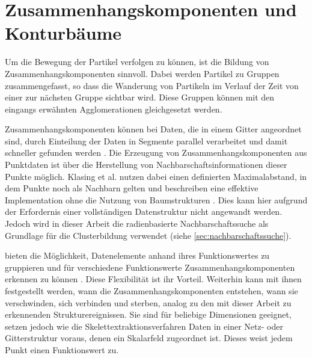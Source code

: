 

\section{Zusammenhangskomponenten und Konturbäume}\label{sec:related:connectedContour}

Um die Bewegung der Partikel verfolgen zu können, ist die Bildung von Zusammenhangskomponenten sinnvoll. Dabei werden Partikel zu Gruppen zusammengefasst, so dass die Wanderung von Partikeln im Verlauf der Zeit von einer zur nächsten Gruppe sichtbar wird. Diese Gruppen können mit den eingangs erwähnten Agglomerationen gleichgesetzt werden.

Zusammenhangskomponenten können bei Daten, die in einem Gitter angeordnet sind, durch Einteilung der Daten in Segmente parallel verarbeitet und damit schneller gefunden werden \cite{trevor2013efficient}. Die Erzeugung von Zusammenhangskomponenten aus Punktdaten ist über die Herstellung von Nachbarschaftsinformationen dieser Punkte möglich. Klasing et al. nutzen dabei einen definierten Maximalabstand, in dem Punkte noch als Nachbarn gelten und beschreiben eine effektive Implementation ohne die Nutzung von Baumstrukturen \cite{klasing2008efficientSegmentationOf3DLaserData}. Dies kann hier aufgrund der Erfordernis einer vollständigen Datenstruktur nicht angewandt werden. Jedoch wird in dieser Arbeit die radienbasierte Nachbarschaftssuche als Grundlage für die Clusterbildung verwendet (siehe \autoref{sec:nachbarschaftssuche}).

 bieten die Möglichkeit, Datenelemente anhand ihres Funktionswertes zu gruppieren und für verschiedene Funktionswerte Zusammenhangskomponenten erkennen zu können \cite{vanKreveld1997isosurfaceTraversal} \cite{bajaj1997contourSpectrum}. Diese Flexibilität ist ihr Vorteil. Weiterhin kann mit ihnen festgestellt werden, wann die Zusammenhangskomponenten entstehen, wann sie verschwinden, sich verbinden und sterben, analog zu den mit dieser Arbeit zu erkennenden Strukturereignissen.
Sie sind für beliebige Dimensionen geeignet, setzen jedoch wie die Skelettextraktionsverfahren Daten in einer Netz- oder Gitterstruktur voraus, denen ein Skalarfeld zugeordnet ist. Dieses weist jedem Punkt einen Funktionswert zu.

